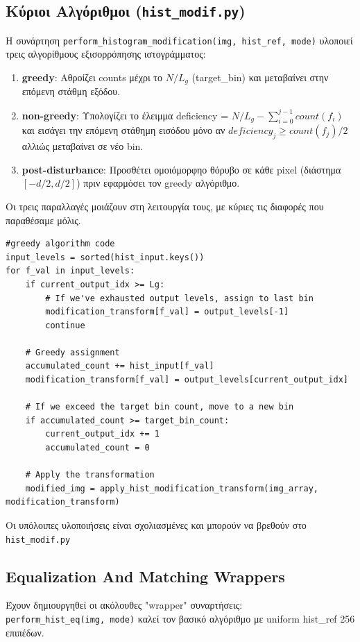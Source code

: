 \documentclass{article}
\begin{document}
\subsection{Κύριοι Αλγόριθμοι (\texttt{hist\_modif.py})}
Η συνάρτηση
\texttt{perform\_histogram\_modification(img, hist\_ref, mode)}
υλοποιεί τρεις αλγορίθμους εξισορρόπησης ιστογράμματος:
\begin{enumerate}
  \item \textbf{greedy}: Αθροίζει counts μέχρι το \(N/L_g\) (target\_bin)
  και μεταβαίνει στην επόμενη στάθμη εξόδου.
  \item \textbf{non-greedy}: Υπολογίζει το έλειμμα deficiency = \(N/L_g -\sum_{i=0}^{j-1} count(f_i)\) \\
  και εισάγει την επόμενη στάθημη εισόδου μόνο αν \(deficiency_j \geq count(f_j)/2\)
  αλλιώς μεταβαίνει σε νέο bin.
  \item \textbf{post-disturbance}: Προσθέτει ομοιόμορφηο θόρυβο σε κάθε pixel
  (διάστημα \([-d/2,d/2]\)) πριν εφαρμόσει τον greedy αλγόριθμο.
\end{enumerate}
Οι τρεις παραλλαγές μοιάζουν στη λειτουργία τους, με κύριες τις διαφορές που παραθέσαμε μόλις. 

\begin{lstlisting}
#greedy algorithm code
input_levels = sorted(hist_input.keys())
for f_val in input_levels:
    if current_output_idx >= Lg:
        # If we've exhausted output levels, assign to last bin
        modification_transform[f_val] = output_levels[-1]
        continue

    # Greedy assignment
    accumulated_count += hist_input[f_val]
    modification_transform[f_val] = output_levels[current_output_idx]

    # If we exceed the target bin count, move to a new bin
    if accumulated_count >= target_bin_count:
        current_output_idx += 1
        accumulated_count = 0

    # Apply the transformation
    modified_img = apply_hist_modification_transform(img_array, modification_transform)
\end{lstlisting}

Οι υπόλοιπες υλοποιήσεις είναι σχολιασμένες και μπορούν να βρεθούν στο \texttt{hist\_modif.py}

\subsection{Equalization And Matching Wrappers}
Έχουν δημιουργηθεί οι ακόλουθες "wrapper" συναρτήσεις: \\
\texttt{perform\_hist\_eq(img, mode)} καλεί τον βασικό αλγόριθμο με
uniform hist\_ref 256 επιπέδων. 
\end{document}
